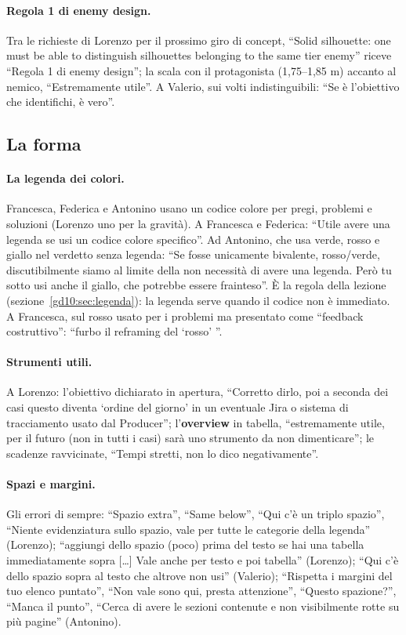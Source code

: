 \paragraph{Regola 1 di enemy design.} Tra le richieste di Lorenzo per il
prossimo giro di concept, ``Solid silhouette: one must be able to distinguish
silhouettes belonging to the same tier enemy'' riceve ``Regola 1 di enemy
design''; la scala con il protagonista (1,75--1,85 m) accanto al nemico,
``Estremamente utile''. A Valerio, sui volti indistinguibili: ``Se è
l'obiettivo che identifichi, è vero''.

\subsection{La forma}
\label{rv:t6:sec:forma}

\paragraph{La legenda dei colori.} Francesca, Federica e Antonino usano un codice
colore per pregi, problemi e soluzioni (Lorenzo uno per la gravità). A Francesca e Federica: ``Utile avere una
legenda se usi un codice colore specifico''. Ad Antonino, che usa verde, rosso
e giallo nel verdetto senza legenda: ``Se fosse unicamente bivalente,
rosso/verde, discutibilmente siamo al limite della non necessità di avere una
legenda. Però tu sotto usi anche il giallo, che potrebbe essere frainteso''.
È la regola della lezione (sezione~\ref{gd10:sec:legenda}): la legenda serve
quando il codice non è immediato. A Francesca, sul rosso usato per i problemi
ma presentato come ``feedback costruttivo'': ``furbo il reframing del
`rosso' ''.

\paragraph{Strumenti utili.} A Lorenzo: l'obiettivo dichiarato in apertura,
``Corretto dirlo, poi a seconda dei casi questo diventa `ordine del giorno' in
un eventuale Jira o sistema di tracciamento usato dal Producer'';
l'\textbf{overview} in tabella, ``estremamente utile, per il futuro (non in
tutti i casi) sarà uno strumento da non dimenticare''; le scadenze ravvicinate,
``Tempi stretti, non lo dico negativamente''.

\paragraph{Spazi e margini.} Gli errori di sempre: ``Spazio extra'',
``Same below'', ``Qui c'è un triplo spazio'', ``Niente evidenziatura sullo
spazio, vale per tutte le categorie della legenda'' (Lorenzo); ``aggiungi
dello spazio (poco) prima del testo se hai una tabella immediatamente sopra
[\dots] Vale anche per testo e poi tabella'' (Lorenzo); ``Qui c'è dello
spazio sopra al testo che altrove non usi'' (Valerio); ``Rispetta i margini
del tuo elenco puntato'', ``Non vale sono qui, presta attenzione'', ``Questo
spazione?'', ``Manca il punto'', ``Cerca di avere le sezioni contenute e non
visibilmente rotte su più pagine'' (Antonino).

